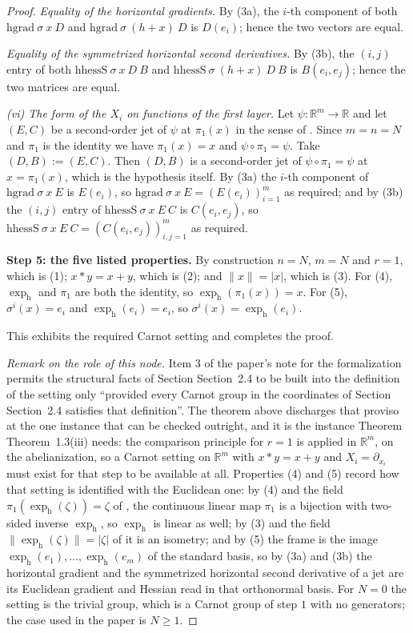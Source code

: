 \begin{proof}
\quad\emph{Equality of the horizontal gradients.} By (3a), the $i$-th component of both
$\mathrm{hgrad}\ \sigma\ x\ D$ and $\mathrm{hgrad}\ \sigma\ (h+x)\ D$ is $D(e_i)$; hence the
two vectors are equal.

\quad\emph{Equality of the symmetrized horizontal second derivatives.} By (3b), the
$(i,j)$ entry of both $\mathrm{hhessS}\ \sigma\ x\ D\ B$ and
$\mathrm{hhessS}\ \sigma\ (h+x)\ D\ B$ is $B(e_i,e_j)$; hence the two matrices are equal.

\emph{(vi) The form of the $X_i$ on functions of the first layer.} Let
$\psi:\mathbb R^{m}\to\mathbb R$ and let $(E,C)$ be a second-order jet of $\psi$ at
$\pi_1(x)$ in the sense of . Since $m=n=N$ and $\pi_1$ is the identity
we have $\pi_1(x)=x$ and $\psi\circ\pi_1=\psi$. Take $(D,B):=(E,C)$. Then
$(D,B)$ is a second-order jet of $\psi\circ\pi_1=\psi$ at $x=\pi_1(x)$, which is the
hypothesis itself. By (3a) the $i$-th component of $\mathrm{hgrad}\ \sigma\ x\ E$ is
$E(e_i)$, so $\mathrm{hgrad}\ \sigma\ x\ E=(E(e_i))_{i=1}^{m}$ as required; and by (3b) the
$(i,j)$ entry of $\mathrm{hhessS}\ \sigma\ x\ E\ C$ is $C(e_i,e_j)$, so
$\mathrm{hhessS}\ \sigma\ x\ E\ C=(C(e_i,e_j))_{i,j=1}^{m}$ as required.

\medskip\noindent\textbf{Step 5: the five listed properties.} By construction $n=N$,
$m=N$ and $r=1$, which is (1); $x*y=x+y$, which is (2); and $\|x\|=|x|$, which is (3). For
(4), $\exp_{\mathrm h}$ and $\pi_1$ are both the identity, so
$\exp_{\mathrm h}(\pi_1(x))=x$. For (5), $\sigma^i(x)=e_i$ and
$\exp_{\mathrm h}(e_i)=e_i$, so $\sigma^i(x)=\exp_{\mathrm h}(e_i)$.

This exhibits the required Carnot setting and completes the proof.

\medskip\noindent\emph{Remark on the role of this node.} Item 3 of the paper's note for the
formalization permits the structural facts of Section Section~2.4 to be built into the
definition of the setting only ``provided every Carnot group in the coordinates of Section
Section~2.4 satisfies that definition''. The theorem above discharges that proviso at the
one instance that can be checked outright, and it is the instance Theorem Theorem~1.3(iii)
needs: the comparison principle for $r=1$ is applied in $\mathbb R^{m}$, on the
abelianization, so a Carnot setting on $\mathbb R^{m}$ with $x*y=x+y$ and
$X_i=\partial_{x_i}$ must exist for that step to be available at all. Properties (4) and
(5) record how that setting is identified with the Euclidean one: by (4) and the field
$\pi_1(\exp_{\mathrm h}(\zeta))=\zeta$ of , the continuous linear map
$\pi_1$ is a bijection with two-sided inverse $\exp_{\mathrm h}$, so $\exp_{\mathrm h}$ is
linear as well; by (3) and the field $\|\exp_{\mathrm h}(\zeta)\|=|\zeta|$ of
 it is an isometry; and by (5) the frame is the image
$\exp_{\mathrm h}(e_1),\ldots,\exp_{\mathrm h}(e_m)$ of the standard basis, so by (3a) and
(3b) the horizontal gradient and the symmetrized horizontal second derivative of a jet are
its Euclidean gradient and Hessian read in that orthonormal basis. For $N=0$ the setting is
the trivial group, which is a Carnot group of step $1$ with no generators; the case used in
the paper is $N\ge1$.
\end{proof}
